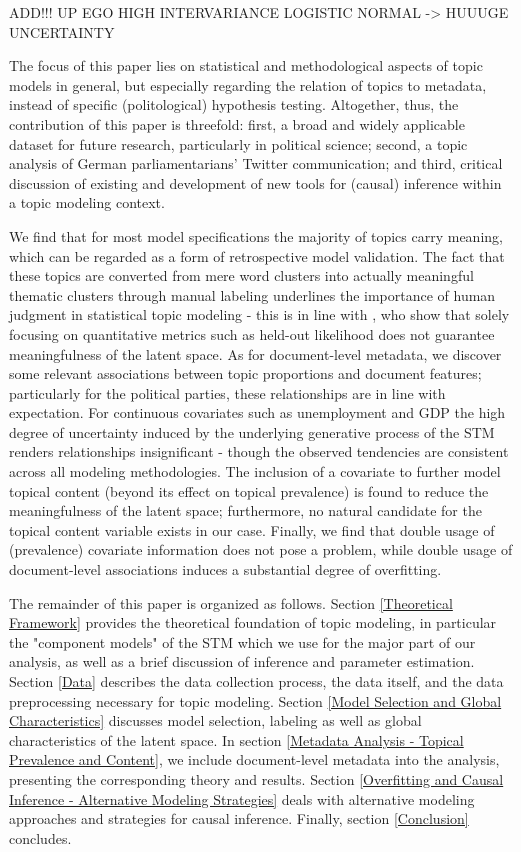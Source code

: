 ADD!!! UP EGO HIGH INTERVARIANCE LOGISTIC NORMAL -> HUUUGE UNCERTAINTY

The focus of this paper lies on statistical and methodological aspects of topic models in general, but especially regarding the relation of topics to metadata, instead of specific (politological) hypothesis testing. Altogether, thus, the contribution of this paper is threefold: first, a broad and widely applicable dataset for future research, particularly in political science; second, a topic analysis of German parliamentarians' Twitter communication; and third, critical discussion of existing and development of new tools for (causal) inference within a topic modeling context.

We find that for most model specifications the majority of topics carry meaning, which can be regarded as a form of retrospective model validation. The fact that these topics are converted from mere word clusters into actually meaningful thematic clusters through manual labeling underlines the importance of human judgment in statistical topic modeling - this is in line with \cite{chang2009reading}, who show that solely focusing on quantitative metrics such as held-out likelihood does not guarantee meaningfulness of the latent space. As for document-level metadata, we discover some relevant associations between topic proportions and document features; particularly for the political parties, these relationships are in line with expectation. For continuous covariates such as unemployment and GDP the high degree of uncertainty induced by the underlying generative process of the STM renders relationships insignificant - though the observed tendencies are consistent across all modeling methodologies. The inclusion of a covariate to further model topical content (beyond its effect on topical prevalence) is found to reduce the meaningfulness of the latent space; furthermore, no natural candidate for the topical content variable exists in our case. Finally, we find that double usage of (prevalence) covariate information does not pose a problem, while double usage of document-level associations induces a substantial degree of overfitting.

The remainder of this paper is organized as follows. Section \ref{Theoretical Framework} provides the theoretical foundation of topic modeling, in particular the "component models" of the STM which we use for the major part of our analysis, as well as a brief discussion of inference and parameter estimation. Section \ref{Data} describes the data collection process, the data itself, and the data preprocessing necessary for topic modeling. Section \ref{Model Selection and Global Characteristics} discusses model selection, labeling as well as global characteristics of the latent space. In section \ref{Metadata Analysis - Topical Prevalence and Content}, we include document-level metadata into the analysis, presenting the corresponding theory and results. Section \ref{Overfitting and Causal Inference - Alternative Modeling Strategies} deals with alternative modeling approaches and strategies for causal inference. Finally, section \ref{Conclusion} concludes.
